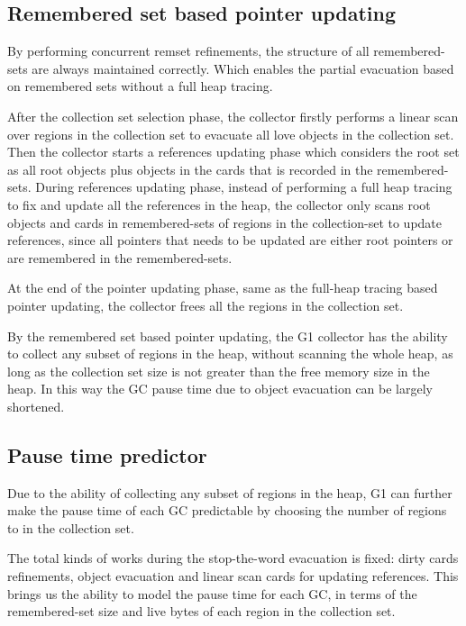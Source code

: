 \subsection{Remembered set based pointer updating}

By performing concurrent remset refinements, the structure of all remembered-sets are always maintained correctly.
Which enables the partial evacuation based on remembered sets without a full heap tracing.

After the collection set selection phase, the collector firstly performs a linear
scan over regions in the collection set to evacuate all love objects in the collection set.
Then the collector starts a references updating phase which considers
the root set as all root objects plus objects in the cards that is recorded in the remembered-sets.
During references updating phase, instead of performing a full heap tracing to fix and
update all the references in the heap, the collector only scans root objects and
cards in remembered-sets of regions in the collection-set to update references,
since all pointers that needs to be updated are either root pointers or are remembered in the remembered-sets.

At the end of the pointer updating phase, same as the full-heap tracing based
pointer updating, the collector frees all the regions in the collection set.

By the remembered set based pointer updating, the G1 collector has the ability to collect
any subset of regions in the heap, without scanning the whole heap, as long as the collection set size is not greater
than the free memory size in the heap. In this way the GC pause time due to object evacuation
can be largely shortened.

\subsection{Pause time predictor}

Due to the ability of collecting any subset of regions in the heap, G1 can further
make the pause time of each GC predictable by choosing the number of regions to in the collection set.

The total kinds of works during the stop-the-word evacuation is fixed:
dirty cards refinements, object evacuation and linear scan cards for updating references.
This brings us the ability to model the pause time for each GC, in terms of the remembered-set
size and live bytes of each region in the collection set.

